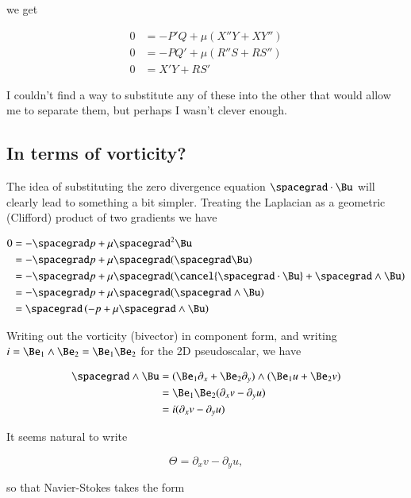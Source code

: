 we get

\begin{align}\label{eqn:nsVorticity:70}
0 &= -P' Q + \mu (X'' Y + X Y'') \\
0 &= -P Q' + \mu (R'' S + R S'') \\
0 &= X' Y + R S'
\end{align}

I couldn't find a way to substitute any of these into the other that would allow me to separate them, but perhaps I wasn't clever enough.  

\subsection{In terms of vorticity?}

The idea of substituting the zero divergence equation $\spacegrad \cdot \Bu$ will clearly lead to something a bit simpler.  Treating the Laplacian as a geometric (Clifford) product of two gradients we have

\begin{align*}
0 
&= -\spacegrad p + \mu \spacegrad^2 \Bu \\
&= -\spacegrad p + \mu \spacegrad ( \spacegrad \Bu ) \\
&= -\spacegrad p + \mu \spacegrad ( \cancel{\spacegrad \cdot \Bu} + \spacegrad \wedge \Bu ) \\
&= -\spacegrad p + \mu \spacegrad ( \spacegrad \wedge \Bu ) \\
&= \spacegrad \left( -p + \mu \spacegrad \wedge \Bu \right)
\end{align*}

Writing out the vorticity (bivector) in component form, and writing $i = \Be_1 \wedge \Be_2 = \Be_1 \Be_2$ for the 2D pseudoscalar, we have

\begin{align*}
\spacegrad \wedge \Bu 
&= (\Be_1 \partial_x + \Be_2 \partial_y) \wedge (\Be_1 u + \Be_2 v) \\
&= \Be_1 \Be_2 (\partial_x v - \partial_y u ) \\
&= i (\partial_x v - \partial_y u )
\end{align*}

It seems natural to write

\begin{equation}\label{eqn:inclinedFlowWithoutConstantHeightAssumption:90}
\Theta = \partial_x v - \partial_y u,
\end{equation}

so that Navier-Stokes takes the form

